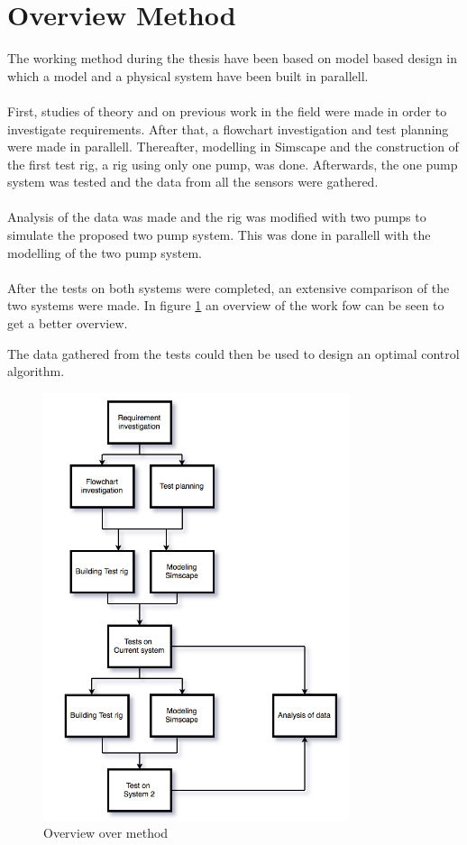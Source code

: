 \section{Overview Method}
The working method during the thesis have been based on model based design in which a model and a physical system have been built in parallell.\\ 
\\
First, studies of theory and on previous work in the field were made in order to investigate requirements. After that, a flowchart investigation and test planning were made in parallell. Thereafter, modelling in Simscape and the construction of the first test rig, a rig using only one  pump,  was done. Afterwards, the one pump system was tested and the data from all the sensors were gathered.\\
\\
Analysis of the data was made and the rig was modified with two pumps to simulate the proposed two pump system. This was done in parallell with the modelling of the two pump system. \\
\\
After the tests on both systems were completed, an extensive comparison of the two systems were made. In figure \ref{fig:metod} an overview of the work fow can be seen to get a better overview.

The data gathered from the tests could then be used to design an optimal control algorithm. 

\begin{figure}[h]
    \centering
    \includegraphics[width=0.8\textwidth]{Metod}
    \caption{Overview over method}
    \label{fig:metod}
\end{figure}\newpage




